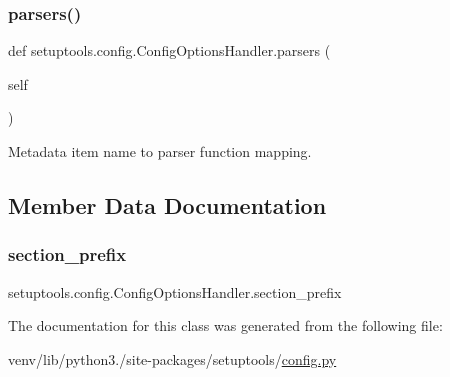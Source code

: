 \subsubsection{\texorpdfstring{parsers()}{parsers()}}
{\footnotesize\ttfamily def setuptools.\+config.\+Config\+Options\+Handler.\+parsers (\begin{DoxyParamCaption}\item[{}]{self }\end{DoxyParamCaption})}

\begin{DoxyVerb}Metadata item name to parser function mapping.\end{DoxyVerb}
 

\subsection{Member Data Documentation}
\mbox{\label{classsetuptools_1_1config_1_1ConfigOptionsHandler_aa0d0e8dc8dd85ccce427a87a558f322e}} 
\subsubsection{\texorpdfstring{section\+\_\+prefix}{section\_prefix}}
{\footnotesize\ttfamily setuptools.\+config.\+Config\+Options\+Handler.\+section\+\_\+prefix\hspace{0.3cm}{\ttfamily [static]}}



The documentation for this class was generated from the following file\+:\begin{DoxyCompactItemize}
\item 
venv/lib/python3./site-\/packages/setuptools/\hyperlink{setuptools_2config_8py}{config.\+py}\end{DoxyCompactItemize}
